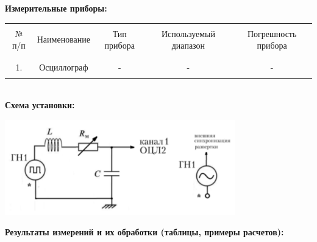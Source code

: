 \documentclass[12pt,a4paper]{report}
\begin{document}
\newpage\noindent
\textbf{Измерительные приборы:} \\
\hfill\break
\begin{tabular}{|c|c|c|c|c|}
    \hline
    & & & & \\
    № п/п & Наименование & Тип прибора & Используемый диапазон & Погрешность прибора \\
    & & & & \\
    \hline
    & & & & \\
    1. & Осциллограф & - & - & - \\
    & & & & \\
    \hline
\end{tabular} \\
\hfill\break
\hfill\break
\textbf{Схема установки:} \\
\begin{center}
    \includegraphics[width=10cm]{scheme.png}
\end{center}
\textbf{Результаты измерений и их обработки (таблицы, примеры расчетов):} \\
\hfill\break
\end{document}
